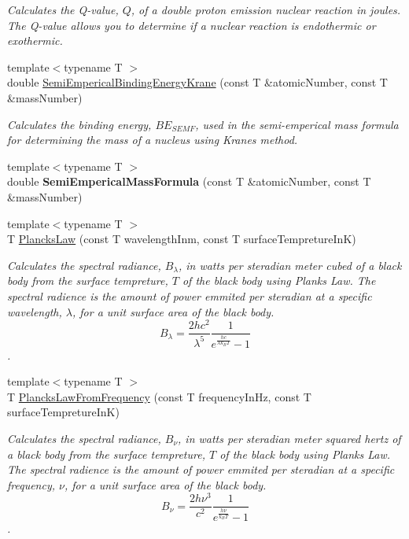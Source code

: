 \begin{DoxyCompactItemize}
\begin{DoxyCompactList}\small\item\em Calculates the Q-\/value, $Q$, of a double proton emission nuclear reaction in joules. The Q-\/value allows you to determine if a nuclear reaction is endothermic or exothermic. \end{DoxyCompactList}\item 
{\footnotesize template$<$typename T $>$ }\\double \mbox{\hyperlink{group___e_g_x_phys-_semi_empirical_mass_formula_ga99c5a87be2c76d3fa4852654c3fd59a9}{Semi\+Emperical\+Binding\+Energy\+Krane}} (const T \&atomic\+Number, const T \&mass\+Number)
\begin{DoxyCompactList}\small\item\em Calculates the binding energy, $BE_{SEMF}$, used in the semi-\/emperical mass formula for determining the mass of a nucleus using Krane\textquotesingle{}s method. \end{DoxyCompactList}\item 
{\footnotesize template$<$typename T $>$ }\\double {\bfseries Semi\+Emperical\+Mass\+Formula} (const T \&atomic\+Number, const T \&mass\+Number)
\item 
{\footnotesize template$<$typename T $>$ }\\T \mbox{\hyperlink{group___e_g_x_phys-_electrodynamics-_black_body-_plancks_law_ga44d8dc3e072ffc7d860cd8f07463f091}{Plancks\+Law}} (const T wavelength\+Inm, const T surface\+Tempreture\+InK)
\begin{DoxyCompactList}\small\item\em Calculates the spectral radiance, $B_{\lambda}$, in watts per steradian meter cubed of a black body from the surface tempreture, $T$ of the black body using Plank\textquotesingle{}s Law. The spectral radience is the amount of power emmited per steradian at a specific wavelength, $\lambda$, for a unit surface area of the black body. \[ B_{\lambda} = \dfrac{2 h c^2}{\lambda^5} \dfrac{1}{e^{\frac{hc}{\lambda k_B T}} - 1} \]. \end{DoxyCompactList}\item 
{\footnotesize template$<$typename T $>$ }\\T \mbox{\hyperlink{group___e_g_x_phys-_electrodynamics-_black_body-_plancks_law_ga68aae82f8a086831358c4a61c8c80ba4}{Plancks\+Law\+From\+Frequency}} (const T frequency\+In\+Hz, const T surface\+Tempreture\+InK)
\begin{DoxyCompactList}\small\item\em Calculates the spectral radiance, $B_{\nu}$, in watts per steradian meter squared hertz of a black body from the surface tempreture, $T$ of the black body using Plank\textquotesingle{}s Law. The spectral radience is the amount of power emmited per steradian at a specific frequency, $\nu$, for a unit surface area of the black body. \[ B_{\nu} = \dfrac{2 h \nu^3}{c^2} \dfrac{1}{e^{\frac{h\nu}{k_B T}} - 1} \]. \end{DoxyCompactList}\item 

\end{DoxyCompactItemize}

